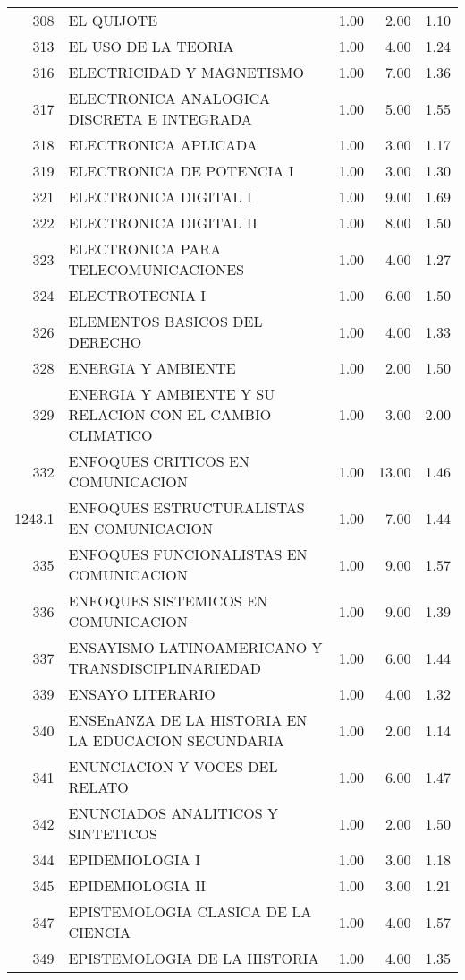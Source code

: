 \documentclass[12pt]{article}
\begin{document}
\begin{table}[ht]
\begin{tabular}{rlrrr}
  308 & EL QUIJOTE & 1.00 & 2.00 & 1.10 \\ 
  313 & EL USO DE LA TEORIA & 1.00 & 4.00 & 1.24 \\ 
  316 & ELECTRICIDAD Y MAGNETISMO & 1.00 & 7.00 & 1.36 \\ 
  317 & ELECTRONICA ANALOGICA DISCRETA E INTEGRADA & 1.00 & 5.00 & 1.55 \\ 
  318 & ELECTRONICA APLICADA & 1.00 & 3.00 & 1.17 \\ 
  319 & ELECTRONICA DE POTENCIA I & 1.00 & 3.00 & 1.30 \\ 
  321 & ELECTRONICA DIGITAL I & 1.00 & 9.00 & 1.69 \\ 
  322 & ELECTRONICA DIGITAL II & 1.00 & 8.00 & 1.50 \\ 
  323 & ELECTRONICA PARA TELECOMUNICACIONES & 1.00 & 4.00 & 1.27 \\ 
  324 & ELECTROTECNIA I & 1.00 & 6.00 & 1.50 \\ 
  326 & ELEMENTOS BASICOS DEL DERECHO & 1.00 & 4.00 & 1.33 \\ 
  328 & ENERGIA Y AMBIENTE & 1.00 & 2.00 & 1.50 \\ 
  329 & ENERGIA Y AMBIENTE Y SU RELACION CON EL CAMBIO CLIMATICO & 1.00 & 3.00 & 2.00 \\ 
  332 & ENFOQUES CRITICOS EN COMUNICACION & 1.00 & 13.00 & 1.46 \\ 
  1243.1 & ENFOQUES ESTRUCTURALISTAS EN COMUNICACION & 1.00 & 7.00 & 1.44 \\ 
  335 & ENFOQUES FUNCIONALISTAS EN COMUNICACION & 1.00 & 9.00 & 1.57 \\ 
  336 & ENFOQUES SISTEMICOS EN COMUNICACION & 1.00 & 9.00 & 1.39 \\ 
  337 & ENSAYISMO LATINOAMERICANO Y TRANSDISCIPLINARIEDAD & 1.00 & 6.00 & 1.44 \\ 
  339 & ENSAYO LITERARIO & 1.00 & 4.00 & 1.32 \\ 
  340 & ENSEnANZA DE LA HISTORIA EN LA EDUCACION SECUNDARIA & 1.00 & 2.00 & 1.14 \\ 
  341 & ENUNCIACION Y VOCES DEL RELATO & 1.00 & 6.00 & 1.47 \\ 
  342 & ENUNCIADOS ANALITICOS Y SINTETICOS & 1.00 & 2.00 & 1.50 \\ 
  344 & EPIDEMIOLOGIA I & 1.00 & 3.00 & 1.18 \\ 
  345 & EPIDEMIOLOGIA II & 1.00 & 3.00 & 1.21 \\ 
  347 & EPISTEMOLOGIA CLASICA DE LA CIENCIA & 1.00 & 4.00 & 1.57 \\ 
  349 & EPISTEMOLOGIA DE LA HISTORIA & 1.00 & 4.00 & 1.35 \\ 

\end{tabular}
\end{table}
\end{document}
